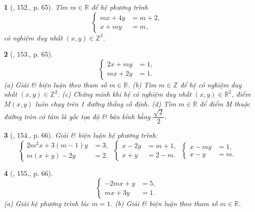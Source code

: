 \documentclass{article}
\newtheorem{baitoan}{}
\begin{document}
\begin{baitoan}[\cite{Dong_23_1001_toan_I}, 152., p. 65]
	Tìm $m\in\mathbb{R}$ để hệ phương trình
	\begin{equation*}
		\left\{\begin{split}
			mx + 4y &= m + 2,\\
			x + my &= m,
		\end{split}\right.
	\end{equation*}
	có nghiệm duy nhất $(x,y)\in\mathbb{Z}^2$.
\end{baitoan}

\begin{baitoan}[\cite{Dong_23_1001_toan_I}, 153., p. 65]
	\begin{equation*}
		\left\{\begin{split}
			2x + my &= 1,\\
			mx + 2y &= 1.
		\end{split}\right.
	\end{equation*}
	(a) Giải \& biện luận theo tham số $m\in\mathbb{R}$. (b) Tìm $m\in\mathbb{Z}$ để hệ có nghiệm duy nhất $(x,y)\in\mathbb{Z}^2$. (c) Chứng minh khi hệ có nghiệm duy nhất $(x,y)\in\mathbb{R}^2$, điểm $M(x,y)$ luôn chạy trên 1 đường thẳng cố định. (d) Tìm $m\in\mathbb{R}$ để điểm M thuộc đường tròn có tâm là gốc tọa độ \& bán kính bằng $\dfrac{\sqrt{2}}{2}$.
\end{baitoan}

\begin{baitoan}[\cite{Dong_23_1001_toan_I}, 154., p. 66]
	Giải \& biện luận hệ phương trình:
	\begin{equation*}
		\left\{\begin{split}
			2m^2x + 3(m - 1)y &= 3,\\
			m(x + y) - 2y &= 2.
		\end{split}\right.\ \left\{\begin{split}
			x - 2y &= m + 1,\\
			x + y &= 2 - m.
		\end{split}\right.\ \left\{\begin{split}
			x - my &= 1,\\
			x - y &= m.
		\end{split}\right.		
	\end{equation*}
\end{baitoan}

\begin{baitoan}[\cite{Dong_23_1001_toan_I}, 155., p. 66]
	\begin{equation*}
		\left\{\begin{split}
			-2mx + y &= 5,\\
			mx + 3y &= 1.
		\end{split}\right.
	\end{equation*}
	(a) Giải hệ phương trình lúc $m = 1$. (b) Giải \& biện luận theo tham số $m\in\mathbb{R}$.
\end{baitoan}
\end{document}
